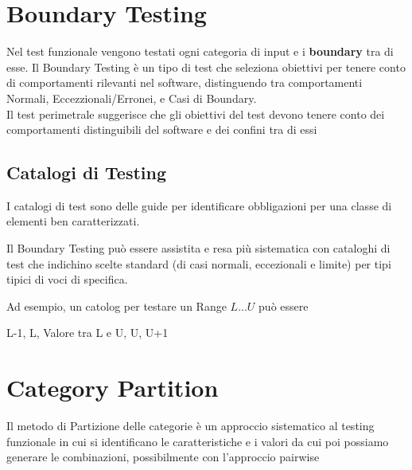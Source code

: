 \section{Boundary Testing}
Nel test funzionale vengono testati ogni categoria di input e i \textbf{boundary} tra di esse.
Il Boundary Testing è un tipo di test che seleziona obiettivi per tenere conto di comportamenti 
rilevanti nel software, distinguendo tra comportamenti Normali, Eccezzionali/Erronei, e Casi di Boundary.
\\Il test perimetrale suggerisce che gli obiettivi del test devono tenere conto dei comportamenti distinguibili del software e dei confini tra di essi

\subsection*{Catalogi di Testing}
I catalogi di test sono delle guide per identificare obbligazioni per una classe di elementi ben caratterizzati.

Il Boundary Testing può essere assistita e resa più sistematica con cataloghi di test che indichino scelte standard (di casi normali, eccezionali e limite) per tipi tipici di voci di specifica.

Ad esempio, un catolog per testare un Range $L ... U$ può essere
\begin{center}
    L-1, L, Valore tra L e U, U, U+1
\end{center}




\section{Category Partition} %
Il metodo di Partizione delle categorie è un approccio sistematico al testing funzionale in cui si identificano le
caratteristiche e i valori da cui poi possiamo generare le combinazioni, possibilmente con l'approccio pairwise

